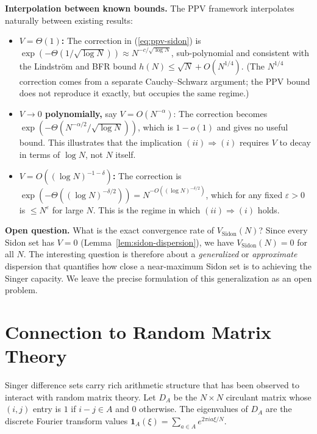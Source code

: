 \documentclass[12pt]{amsart}
\newcommand{\eps}{\varepsilon}
\begin{document}
\medskip
\noindent\textbf{Interpolation between known bounds.}
The PPV framework interpolates naturally between existing results:

\begin{itemize}
\item \textbf{$V = \Theta(1)$:} The correction in (\ref{eq:ppv-sidon}) is
  $\exp(-\Theta(1/\sqrt{\log N})) \approx N^{-c/\sqrt{\log N}}$, sub-polynomial
  and consistent with the Lindstr\"{o}m \cite{Lind69} and BFR \cite{BFR23}
  bound $h(N) \le \sqrt{N} + O(N^{1/4})$.  (The $N^{1/4}$ correction comes
  from a separate Cauchy--Schwarz argument; the PPV bound does not reproduce
  it exactly, but occupies the same regime.)

\item \textbf{$V \to 0$ polynomially,} say $V = O(N^{-\alpha})$: The
  correction becomes $\exp(-\Theta(N^{-\alpha/2}/\sqrt{\log N}))$, which is
  $1 - o(1)$ and gives no useful bound.  This illustrates that the
  implication $(ii) \Rightarrow (i)$ requires $V$ to decay in terms of $\log N$,
  not $N$ itself.

\item \textbf{$V = O((\log N)^{-1-\delta})$:} The correction is
  $\exp(-\Theta((\log N)^{-\delta/2})) = N^{-O((\log N)^{-\delta/2})}$, which
  for any fixed $\eps > 0$ is $\le N^\eps$ for large $N$.  This is the regime
  in which $(ii) \Rightarrow (i)$ holds.
\end{itemize}

\medskip
\noindent\textbf{Open question.}
What is the exact convergence rate of $V_{\mathrm{Sidon}}(N)$?  Since every
Sidon set has $V = 0$ (Lemma~\ref{lem:sidon-dispersion}), we have
$V_{\mathrm{Sidon}}(N) = 0$ for all $N$.  The interesting question is
therefore about a \emph{generalized} or \emph{approximate} dispersion that
quantifies how close a near-maximum Sidon set is to achieving the Singer
capacity.  We leave the precise formulation of this generalization as an open
problem.

\section{Connection to Random Matrix Theory}
\label{sec:rmt}

Singer difference sets carry rich arithmetic structure that has been observed
to interact with random matrix theory.  Let $D_A$ be the $N \times N$
circulant matrix whose $(i,j)$ entry is $1$ if $i - j \in A$ and $0$
otherwise.  The eigenvalues of $D_A$ are the discrete Fourier transform values
$\hat{\mathbf{1}}_A(\xi) = \sum_{a \in A} e^{2\pi i a\xi / N}$.
\end{document}
